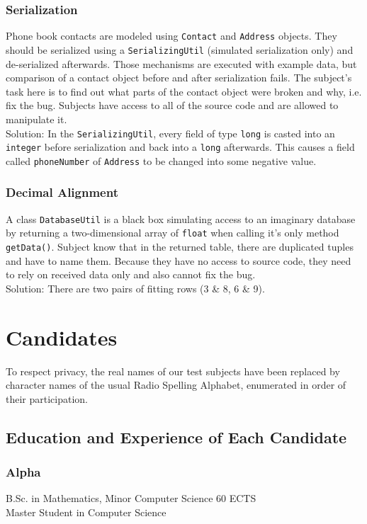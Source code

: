 \documentclass[a4paper,ngerman,english]{amsbook} %
\begin{document}
\subsubsection{Serialization}
Phone book contacts are modeled using \verb.Contact. and \verb.Address. objects. They should be serialized using a \verb.SerializingUtil. (simulated serialization only) and de-serialized afterwards.
Those mechanisms are executed with example data, but comparison of a contact object before and after serialization fails. The subject's task here is to find out what parts of the contact object were broken and why, i.e. fix the bug. Subjects have access to all of the source code and are allowed to manipulate it.\\
Solution: In the \verb.SerializingUtil., every field of type \verb.long. is casted into an \verb.integer. before serialization and back into a \verb.long. afterwards. This causes a field called \verb.phoneNumber. of \verb.Address. to be changed into some negative value.

\subsubsection{Decimal Alignment}
A class \verb.DatabaseUtil. is a black box simulating access to an imaginary database by returning a two-dimensional array of \verb.float. when calling it's only method \verb.getData().. Subject know that in the returned table, there are duplicated tuples and have to name them. Because they have no access to source code, they need to rely on received data only and also cannot fix the bug.\\
Solution: There are two pairs of fitting rows (3 \& 8, 6 \& 9).

\section{Candidates}
To respect privacy, the real names of our test subjects have been replaced by character names of the usual Radio Spelling Alphabet, enumerated in order of their participation.

\subsection{Education and Experience of Each Candidate}
\subsubsection{Alpha} %
B.Sc. in Mathematics, Minor Computer Science 60 ECTS\\
Master Student in Computer Science
\end{document}

